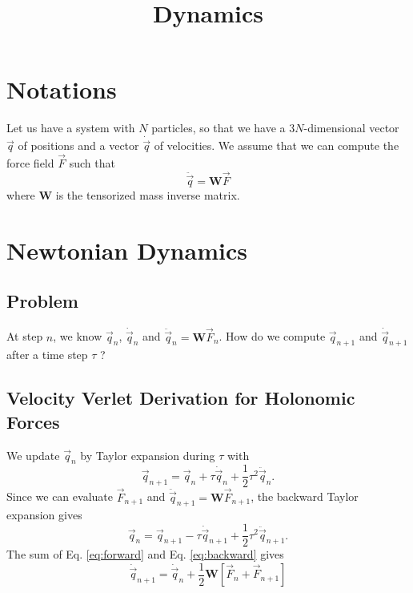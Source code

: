 \documentclass[aps,twocolumn]{revtex4}
\newcommand{\mymat}[1]{\boldsymbol{#1}}
\newcommand{\q}{\vec{q}}
\newcommand{\dq}{\dot{\q}}
\newcommand{\ddq}{\ddot{\q}}
\begin{document}
\title{Dynamics}

\section{Notations}
Let us have a system with $N$ particles, so that we have a $3N$-dimensional
vector $\q$ of positions and a vector $\dq$ of velocities.
We assume that we can compute the force field $\vec{F}$ such that
\begin{equation}
	\label{eq:newton}
	\ddq = \mymat{W} \vec{F}
\end{equation}
where $\mymat{W}$ is the tensorized mass inverse matrix.

\section{Newtonian Dynamics}

\subsection{Problem}
At step $n$, we know $\q_n$, $\dq_n$ and $\ddq_n = \mymat{W} \vec{F}_n$.
How do we compute $\q_{n+1}$ and $\dq_{n+1}$after a time step $\tau$ ?

\subsection{Velocity Verlet Derivation for Holonomic Forces}
We update $\q_n$ by Taylor expansion during $\tau$ with
\begin{equation}
	\label{eq:forward}
	\q_{n+1} = \q_n + \tau \dq_n + \frac{1}{2}\tau^2 \ddq_n.
\end{equation}
Since we can evaluate $\vec{F}_{n+1}$ and $\ddq_{n+1}=\mymat{W}\vec{F}_{n+1}$, the backward Taylor expansion
gives
\begin{equation}
	\label{eq:backward}
	\q_n = \q_{n+1} - \tau \dq_{n+1} + \frac{1}{2}\tau^2 \ddq_{n+1}.
\end{equation}
The sum of Eq. \eqref{eq:forward} and Eq. \eqref{eq:backward} gives 
\begin{equation}
	\label{eq:vv}
	\dq_{n+1} = \dq_{n} + \dfrac{1}{2}\mymat{W}\left\lbrack\vec{F}_n + \vec{F}_{n+1}\right\rbrack
\end{equation}
\end{document}
